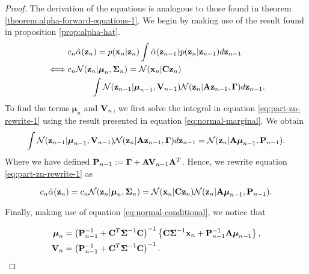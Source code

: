 \documentclass[11pt]{article}
\numberwithin{equation}{section}
\newcommand{\x}{{\bf x}}
\newcommand{\z}{{\bf z}}
\newcommand{\N}{\mathcal{N}}
\begin{document}
\begin{proof}
	The derivation of the equations is analogous to those found in theorem \ref{theorem:alpha-forward-equations-1}. We begin by making use of the result found in proposition \ref{prop:alpha-hat}. 
	\begin{align}
		&c_n \hat\alpha(\z_n) = p(\x_n\vert\z_n) \int \hat\alpha(\z_{n-1})p(\z_n \vert \z_{n-1}) d\z_{n-1}\\
		\iff& c_n \N(\z_n \vert \boldsymbol\mu_n, \boldsymbol\Sigma_n) = \N(\x_n \vert {\bf C}\z_n) \nonumber \\
			&\hspace{1cm} \int \N(\z_{n-1} \vert \boldsymbol\mu_{n-1}, {\bf V}_{n-1}) \N(\z_n \vert {\bf A}\z_{n-1}, \boldsymbol\Gamma) d\z_{n-1} \label{eq:part-zn-rewrite-1}.
	\end{align}
	To find the terms $\boldsymbol\mu_n$ and ${\bf V}_n$, we first solve the integral in equation \eqref{eq:part-zn-rewrite-1} using the result presented in equation \eqref{eq:normal-marginal}. We obtain
	\begin{equation}
		\int \N(\z_{n-1} \vert \boldsymbol\mu_{n-1}, {\bf V}_{n-1}) \N(\z_n \vert {\bf A}\z_{n-1}, \boldsymbol\Gamma) d\z_{n-1} = \N(\z_n \vert {\bf A} \boldsymbol\mu_{n-1}, {\bf P}_{n-1}).
	\end{equation}
	Where we have defined ${\bf P}_{n-1} := \boldsymbol\Gamma + {\bf A}{\bf V}_{n-1}{\bf A}^T$. Hence, we rewrite equation \eqref{eq:part-zn-rewrite-1} as 
	
	\begin{equation} \label{eq:part-cnzn-rewrite}
		c_n\hat\alpha(\z_n)  = c_n \N(\z_n \vert \boldsymbol\mu_n, \boldsymbol\Sigma_n) = \N(\x_n \vert {\bf C}\z_n)  \N(\z_n \vert {\bf A} \boldsymbol\mu_{n-1}, {\bf P}_{n-1}).
	\end{equation}
	
	Finally, making use of equation \eqref{eq:normal-conditional}, we notice that
	
	\begin{align}
		\boldsymbol{\mu}_n &= \left({\bf P}_{n-1}^{-1} + {\bf C}^T \boldsymbol\Sigma^{-1}{\bf C}\right)^{-1} \left\{{\bf C}\boldsymbol\Sigma^{-1}\x_n + {\bf P}_{n-1}^{-1}{\bf A}\boldsymbol\mu_{n-1}\right\},\\
		{\bf V}_n &= \left({\bf P}_{n-1}^{-1} + {\bf C}^T \boldsymbol\Sigma^{-1}{\bf C}\right)^{-1}.
	\end{align}
	

\end{proof}
\end{document}
